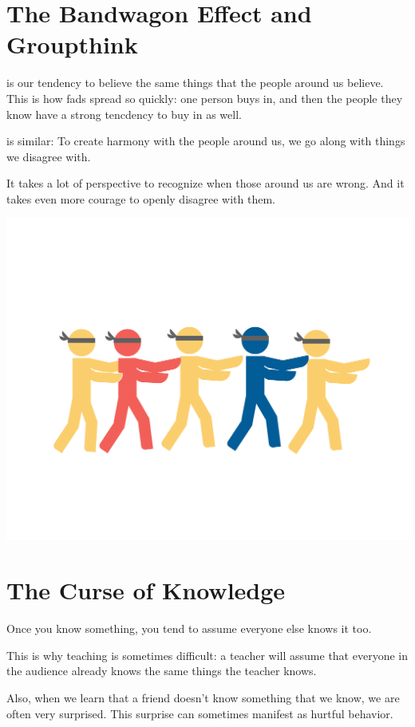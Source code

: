 \section{The Bandwagon Effect and Groupthink}

 is our tendency to believe the same
things that the people around us believe. This is how fads spread so
quickly: one person buys in, and then the people they know have a
strong tencdency to buy in as well.

 is similar: To create harmony with the
people around us, we go along with things we disagree with.

It takes a lot of perspective to recognize when those around us are
wrong. And it takes even more courage to openly disagree with them.

\includegraphics[width=1\textwidth]{bandwagonEffect.png}

\section{The Curse of Knowledge}

Once you know something, you tend to assume everyone else knows it too.

This is why teaching is sometimes difficult: a teacher will assume
that everyone in the audience already knows the same things the
teacher knows.

Also, when we learn that a friend doesn't know something that we know,
we are often very surprised. This surprise can sometimes manifest as
hurtful behavior.

